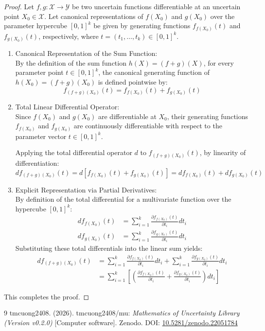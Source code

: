 \documentclass[a4paper,12pt,twoside]{memoir}
\begin{document}
	\begin{proof}
		Let $f, g : \mathcal{X} \to \mathcal{Y}$ be two uncertain functions differentiable at an uncertain point $X_0 \in \mathcal{X}$. Let canonical representations of $f(X_0)$ and $g(X_0)$ over the parameter hypercube $[0, 1]^k$ be given by generating functions $f_{f(X_0)}(t)$ and $f_{g(X_0)}(t)$, respectively, where $t = (t_1, \dots, t_k) \in [0, 1]^k$.
		
		\begin{enumerate}[leftmargin=*]
			\item Canonical Representation of the Sum Function: \\
			By the definition of the sum function $h(X) = (f + g)(X)$, for every parameter point $t \in [0, 1]^k$, the canonical generating function of $h(X_0) = (f+g)(X_0)$ is defined pointwise by:
			\[
			f_{(f+g)(X_0)}(t) = f_{f(X_0)}(t) + f_{g(X_0)}(t)
			\]
			
			\item Total Linear Differential Operator: \\
			Since $f(X_0)$ and $g(X_0)$ are differentiable at $X_0$, their generating functions $f_{f(X_0)}$ and $f_{g(X_0)}$ are continuously differentiable with respect to the parameter vector $t \in [0, 1]^k$.
			
			Applying the total differential operator $d$ to $f_{(f+g)(X_0)}(t)$, by linearity of differentiation:
			\[
			d f_{(f+g)(X_0)}(t) = d \left[ f_{f(X_0)}(t) + f_{g(X_0)}(t) \right] = d f_{f(X_0)}(t) + d f_{g(X_0)}(t)
			\]
			
			\item Explicit Representation via Partial Derivatives: \\
			By definition of the total differential for a multivariate function over the hypercube $[0, 1]^k$:
			\begin{align*}
				d f_{f(X_0)}(t) & = \sum_{i=1}^{k} \frac{\partial f_{f(X_0)}(t)}{\partial t_i} dt_i  \\
				d f_{g(X_0)}(t) & = \sum_{i=1}^{k} \frac{\partial f_{g(X_0)}(t)}{\partial t_i} dt_i
			\end{align*}
			Substituting these total differentials into the linear sum yields:
			\begin{align*}
				d f_{(f+g)(X_0)}(t) & = \sum_{i=1}^{k} \frac{\partial f_{f(X_0)}(t)}{\partial t_i} dt_i + \sum_{i=1}^{k} \frac{\partial f_{g(X_0)}(t)}{\partial t_i} dt_i           \\
				& = \sum_{i=1}^{k} \left[ \left( \frac{\partial f_{f(X_0)}(t)}{\partial t_i} + \frac{\partial f_{g(X_0)}(t)}{\partial t_i} \right) dt_i \right]
			\end{align*}
		\end{enumerate}
		This completes the proof.
	\end{proof}
	
	\begin{thebibliography}{9}
		tmcuong2408. (2026). tmcuong2408/mu: \textit{Mathematics of Uncertainty Library (Version v0.2.0)} [Computer software]. Zenodo.
		DOI: \href{https://doi.org/10.5281/zenodo.22051784}{10.5281/zenodo.22051784}
	\end{thebibliography}
\end{document}
